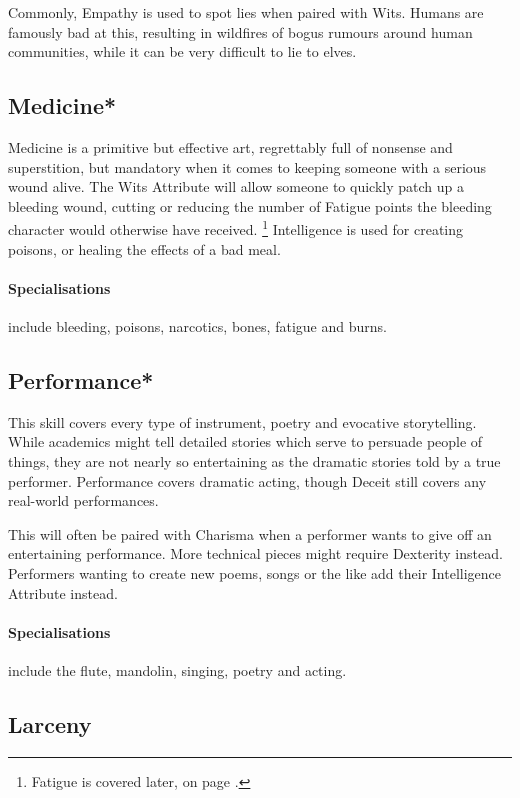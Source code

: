 \begin{multicols}{2}
Commonly, Empathy is used to spot lies when paired with Wits. Humans are famously bad at this, resulting in wildfires of bogus rumours around human communities, while it can be very difficult to lie to elves.

\subsection{Medicine*}

Medicine is a primitive but effective art, regrettably full of nonsense and superstition, but mandatory when it comes to keeping someone with a serious wound alive.
The Wits Attribute will allow someone to quickly patch up a bleeding wound, cutting or reducing the number of Fatigue points the bleeding character would otherwise have received.
\footnote{Fatigue is covered later, on page \pageref{fatigue}.}
Intelligence is used for creating poisons, or healing the effects of a bad meal.

\paragraph{Specialisations} include bleeding, poisons, narcotics, bones, fatigue and burns.

\subsection{Performance*}

This skill covers every type of instrument, poetry and evocative storytelling. While academics might tell detailed stories which serve to persuade people of things, they are not nearly so entertaining as the dramatic stories told by a true performer. Performance covers dramatic acting, though Deceit still covers any real-world performances.

This will often be paired with Charisma when a performer wants to give off an entertaining performance. More technical pieces might require Dexterity instead. Performers wanting to create new poems, songs or the like add their Intelligence Attribute instead.

\paragraph{Specialisations} include the flute, mandolin, singing, poetry and acting.

\subsection{Larceny}


\end{multicols}
